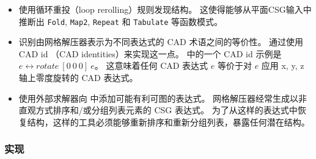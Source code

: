 \begin{itemize}

  \item 使用循环重投（loop rerolling）规则发现结构。
    这使得\sz 能够从平面CSG输入中推断出
    \texttt{Fold}, \texttt{Map2}, \texttt{Repeat} 和 \texttt{Tabulate} 
    等函数模式。

  \item 识别由网格解压器表示为不同表达式的 CAD 术语之间的等价性。
    \sz 通过使用 CAD id （CAD identities）来实现这一点。
    \sz 中的一个 CAD id 示例是
    $e \leftrightarrow \mathit{rotate}~[0 ~ 0 ~ 0] ~ e$。
    这意味着任何 CAD 表达式 $e$ 等价于对 $e$ 应用 x, y, z 轴上零度旋转的 CAD 表达式。

  \item 使用外部求解器向 \egraph 中添加可能有利可图的表达式。
    网格解压器经常生成以非直观方式排序和/或分组列表元素的 CSG 表达式。
    为了从这样的表达式中恢复结构，\sz 这样的工具必须能够重新排序和重新分组列表，暴露任何潜在结构。

\end{itemize}

\subsubsection{实现}


